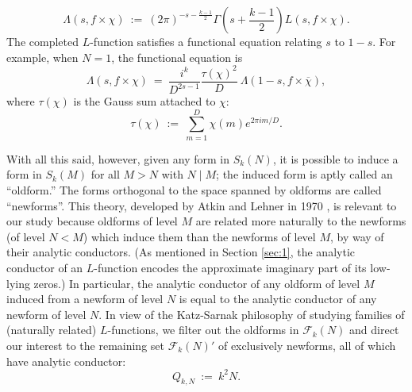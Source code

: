 \documentclass[12pt, reqno,oneside]{amsart}
\theoremstyle{plain}
\theoremstyle{definition}
\theoremstyle{remark}
\theoremstyle{plain}
\numberwithin{equation}{section}
\begin{document}
\begin{equation}\label{eq:completed-l-function}
    \Lambda(s,f\times\chi) \ := \ (2\pi)^{-s-\frac{k-1}{2}}\Gamma\left(s+\frac{k-1}{2}\right)L(s,f\times\chi).
\end{equation} 
The completed $L$-function satisfies a functional equation relating $s$ to $1-s$. For example, when $N=1$, the functional equation is
\begin{equation}\label{eq:functional}
    \Lambda(s,f\times\chi) \ = \ \frac{i^k}{D^{2s-1}}\frac{\tau(\chi)^2}{D} \ \Lambda(1-s,f\times\overline{\chi}),
\end{equation} where $\tau(\chi)$ is the Gauss sum attached to $\chi$:
\begin{equation}\label{eq:gauss-sum}
\tau(\chi)\ := \ \sum_{m=1}^D\chi(m)e^{2\pi im/D}.
\end{equation}

With all this said, however, given any form in $S_k(N)$, it is possible to induce a form in $S_k(M)$ for all $M>N$ with $N\mid M$; the induced form is aptly called an ``oldform.'' The forms orthogonal to the space spanned by oldforms are called ``newforms''. This theory, developed by Atkin and Lehner in 1970 \cite{AL70}, is relevant to our study because oldforms of level $M$ are related more naturally to the newforms (of level $N<M$) which induce them than the newforms of level $M$, by way of their analytic conductors. (As mentioned in Section \ref{sec:1}, the analytic conductor of an $L$-function encodes the approximate imaginary part of its low-lying zeros.) In particular, the analytic conductor of any oldform of level $M$ induced from a newform of level $N$ is equal to the analytic conductor of any newform of level $N$. In view of the Katz-Sarnak philosophy of studying families of (naturally related) $L$-functions, we filter out the oldforms in $\mathcal{F}_k(N)$ and direct our interest to the remaining set $\mathcal{F}_k(N)'$ of exclusively newforms, all of which have analytic conductor:
\begin{equation}\label{eq:analytic-conductor}
    Q_{k,N} \ := \ k^2N. 
\end{equation}
\end{document}
